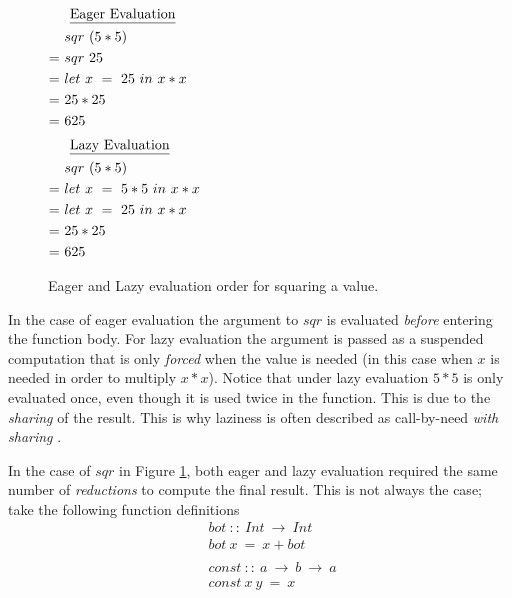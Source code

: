 \begin{figure}[!h]
\centering
\begin{multicols}{2}
\noindent
\begin{align*}
     \noalign{$\text{\underline{Eager Evaluation}}$}
     &sqr\ (5*5) \\
  =\ &sqr\ 25 \\
  =\ &let\ x\ =\ 25\ in\ x * x \\
  =\ &25 * 25 \\
  =\ &625
\end{align*}
\begin{align*}
     \noalign{$\text{\underline{Lazy Evaluation}}$}
     &sqr\ (5*5) \\
  =\ &let\ x\ =\ 5*5\ in\ x * x \\
  =\ &let\ x\ =\ 25\ in\ x * x \\
  =\ &25 * 25 \\
  =\ &625
\end{align*}
\end{multicols}
\caption{Eager and Lazy evaluation order for squaring a value.}
\label{fig:eagerandlazy}
\end{figure}

In the case of eager evaluation the argument to $sqr$ is evaluated
\emph{before} entering the function body. For lazy evaluation the argument is
passed as a suspended computation that is only \emph{forced} when the value is
needed (in this case when $x$ is needed in order to multiply $x*x$). Notice
that under lazy evaluation $5*5$ is only evaluated once, even though it is
used twice in the function. This is due to the \emph{sharing} of the result.
This is why laziness is often described as call-by-need \emph{with sharing}
\citep{hammond2000research}.

\medskip

In the case of $sqr$ in Figure \ref{fig:eagerandlazy}, both eager and lazy
evaluation required the same number of \emph{reductions} to compute the final
result. This is not always the case; take the following function definitions
\begin{align*}
    &bot \ :: \ Int\ \rightarrow\ Int \\
    &bot\ x\ =\ x + bot \\
    \quad & \\
    &const\ :: \ a\ \rightarrow\ b\ \rightarrow\ a \\
    &const\ x\ y\ =\ x
\end{align*}
\label{fig:botAndConst}


